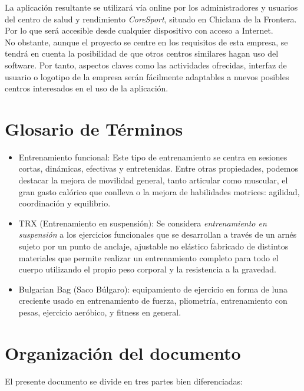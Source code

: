 La aplicación resultante se utilizará vía online por los administradores y usuarios del centro de salud y rendimiento \textsl{CoreSport}, situado en Chiclana de la Frontera. Por lo que será accesible desde cualquier dispositivo con acceso a Internet. 
\\

No obstante, aunque el proyecto se centre en los requisitos de esta empresa, se tendrá en cuenta la posibilidad de que otros centros similares hagan uso del software. Por tanto, aspectos claves como las actividades ofrecidas, interfaz de usuario o logotipo de la empresa serán fácilmente adaptables a nuevos posibles centros interesados en el uso de la aplicación. 


\section{Glosario de Términos} 

\begin{itemize} 
\item Entrenamiento funcional: Este tipo de entrenamiento se centra en sesiones cortas, dinámicas, efectivas y entretenidas. Entre otras propiedades, podemos destacar la mejora de movilidad general, tanto articular como muscular, el gran gasto calórico que conlleva o la mejora de habilidades motrices: agilidad, coordinación y equilibrio. 
\item TRX (Entrenamiento en suspensión):  Se considera \textsl{entrenamiento en suspensión} a los ejercicios funcionales que se desarrollan a través de un arnés sujeto por un punto de anclaje, ajustable no elástico fabricado de distintos materiales que permite realizar un entrenamiento completo para todo el cuerpo utilizando el propio peso corporal y la resistencia a la gravedad.
\item Bulgarian Bag (Saco Búlgaro): equipamiento de ejercicio en forma de luna creciente usado en entrenamiento de fuerza, pliometría, entrenamiento con pesas, ejercicio aeróbico, y fitness en general.
\end {itemize}


\section{Organización del documento}

El presente documento se divide en tres partes bien diferenciadas: 

